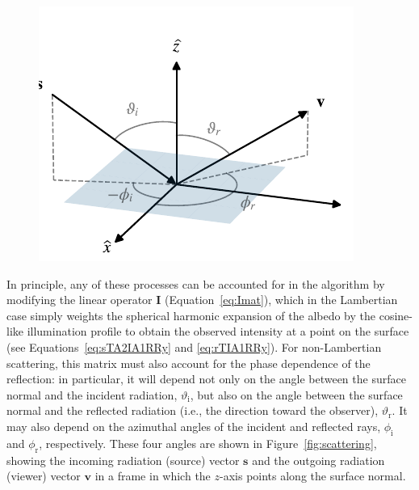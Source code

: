 \documentclass[modern]{aastex62}
\begin{document}
\begin{figure}[t!]
    \begin{centering}
        \includegraphics[width=0.5\linewidth]{figures/scattering.pdf}
    \end{centering}
\end{figure}

In principle, any of these processes can be accounted for in
the \starry algorithm by modifying the linear operator
$\mathbf{I}$ (Equation~\ref{eq:Imat}), which in the Lambertian
case simply weights the spherical harmonic expansion of the albedo
by the cosine-like illumination profile to obtain the observed
intensity at a point on the surface
(see Equations~\ref{eq:sTA2IA1RRy} and \ref{eq:rTIA1RRy}).
For non-Lambertian scattering, this matrix must also account for
the phase dependence of the reflection: in particular, it will depend
not only on the angle between the surface normal and the incident
radiation, $\vartheta_\mathrm{i}$, but also on the angle between the surface
normal and the reflected radiation (i.e., the direction toward the
observer), $\vartheta_\mathrm{r}$. It may also depend on the azimuthal angles
of the incident and reflected rays, $\phi_\mathrm{i}$ and $\phi_\mathrm{r}$, respectively.
These four angles are shown in Figure~\ref{fig:scattering}, showing
the incoming radiation (source) vector $\mathbf{s}$ and the outgoing
radiation (viewer) vector $\mathbf{v}$ in a frame in which the $z$-axis
points along the surface normal.
\end{document}
